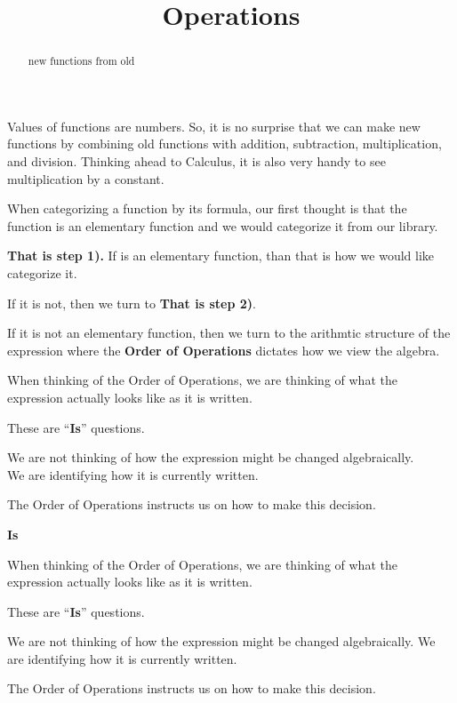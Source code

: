 \documentclass{ximera}
\title{Operations}
\begin{document}
\begin{abstract}
new functions from old
\end{abstract}
\maketitle



Values of functions are numbers.  So, it is no surprise that we can make new functions by combining old functions with addition, subtraction, multiplication, and division. Thinking ahead to Calculus, it is also very handy to see multiplication by a constant.





When categorizing a function by its formula, our first thought is that the function is an elementary function and we would categorize it from our library. 

\textbf{That is step 1).}  If is an elementary function, than that is how we would like categorize it.


If it is not, then we turn to \textbf{That is step 2)}.



If it is not an elementary function, then we turn to the arithmtic structure of the expression where the \textbf{Order of Operations} dictates how we view the algebra. 

When thinking of the Order of Operations, we are thinking of what the expression actually looks like as it is written.


\begin{center}
These are ``\textbf{\textcolor{red!70!black}{Is}}'' questions.
\end{center}

We are not thinking of how the expression might be changed algebraically. \\ We are identifying how it is currently written. 

The Order of Operations instructs us on how to make this decision.






\begin{warning}  \textbf{\textcolor{red!70!black}{Is}}


When thinking of the Order of Operations, we are thinking of what the expression actually looks like as it is written.


\begin{center}
These are ``\textbf{\textcolor{red!70!black}{Is}}'' questions.
\end{center}

We are not thinking of how the expression might be changed algebraically.  We are identifying how it is currently written. 

The Order of Operations instructs us on how to make this decision.

\end{warning}
\end{document}
